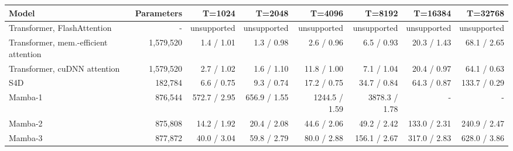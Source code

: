 \begin{tabular}{lrrrrrrr}
\toprule
Model & Parameters & T=1024 & T=2048 & T=4096 & T=8192 & T=16384 & T=32768 \\
\midrule
Transformer, FlashAttention & - & unsupported & unsupported & unsupported & unsupported & unsupported & unsupported \\
Transformer, mem.-efficient attention & 1,579,520 & 1.4 / 1.01 & 1.3 / 0.98 & 2.6 / 0.96 & 6.5 / 0.93 & 20.3 / 1.43 & 68.1 / 2.65 \\
Transformer, cuDNN attention & 1,579,520 & 2.7 / 1.02 & 1.6 / 1.10 & 11.8 / 1.00 & 7.1 / 1.04 & 20.4 / 0.97 & 64.1 / 0.63 \\
S4D & 182,784 & 6.6 / 0.75 & 9.3 / 0.74 & 17.2 / 0.75 & 34.7 / 0.84 & 64.3 / 0.87 & 133.7 / 0.29 \\
Mamba-1 & 876,544 & 572.7 / 2.95 & 656.9 / 1.55 & 1244.5 / 1.59 & 3878.3 / 1.78 & - & - \\
Mamba-2 & 875,808 & 14.2 / 1.92 & 20.4 / 2.08 & 44.6 / 2.06 & 49.2 / 2.42 & 133.0 / 2.31 & 240.9 / 2.47 \\
Mamba-3 & 877,872 & 40.0 / 3.04 & 59.8 / 2.79 & 80.0 / 2.88 & 156.1 / 2.67 & 317.0 / 2.83 & 628.0 / 3.86 \\
\bottomrule
\end{tabular}
\par{}
